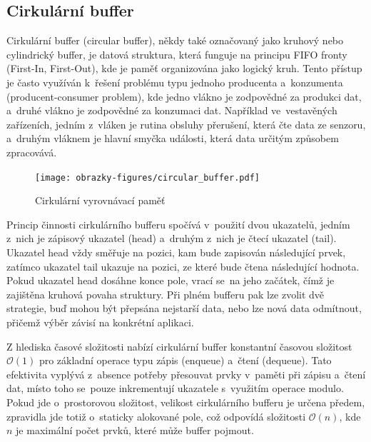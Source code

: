 \newpage

\subsection{Cirkulární buffer}
\label{cirkularni_buffer}
Cirkulární buffer (circular buffer), někdy také označovaný jako kruhový nebo cylindrický buffer, je datová struktura, která funguje na principu FIFO fronty (First-In, First-Out), kde je paměť organizována jako logický kruh. Tento přístup je často využíván k~řešení problému typu jednoho producenta a~konzumenta (producent-consumer problem), kde jedno vlákno je zodpovědné za produkci dat, a~druhé vlákno je zodpovědné za konzumaci dat. Například ve~vestavěných zařízeních, jedním z~vláken je rutina obsluhy přerušení, která čte data ze senzoru, a~druhým vláknem je hlavní smyčka události, která data určitým způsobem zpracovává.~\cite{embedjournal_ring_buffer}


\begin{figure}[h]
    \centering
    \texttt{[image: obrazky-figures/circular\_buffer.pdf]}
    
    \caption{Cirkulární vyrovnávací paměť}
    \label{fig:circular-buffer}
\end{figure}

Princip činnosti cirkulárního bufferu spočívá v~použití dvou ukazatelů, jedním z~nich je zápisový ukazatel (head) a~druhým z~nich je čtecí ukazatel (tail). Ukazatel head vždy směřuje na pozici, kam bude zapisován následující prvek, zatímco ukazatel tail ukazuje na pozici, ze které bude čtena následující hodnota. Pokud ukazatel head dosáhne konce pole, vrací se~na jeho začátek, čímž je zajištěna kruhová povaha struktury. Při plném bufferu pak lze zvolit dvě strategie, buď mohou být přepsána nejstarší data, nebo lze nová data odmítnout, přičemž výběr závisí na konkrétní aplikaci.~\cite{embedjournal_ring_buffer, medium_ring_buffer}

Z hlediska časové složitosti nabízí cirkulární buffer konstantní časovou složitost $\mathcal{O}(1)$ pro základní operace typu zápis (enqueue) a~čtení (dequeue). Tato efektivita vyplývá z~absence potřeby přesouvat prvky v~paměti při zápisu a~čtení dat, místo toho se~pouze inkrementují ukazatele s~využitím operace modulo. Pokud jde o~prostorovou složitost, velikost cirkulárního bufferu je určena předem, zpravidla jde totiž o~staticky alokované pole, což odpovídá složitosti $\mathcal{O}(n)$, kde $n$ je maximální počet prvků, které může buffer pojmout.~\cite{petrungaro_ring_buffer_complexity}

